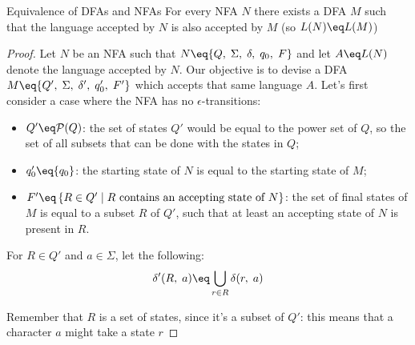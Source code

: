 \begin{theorem}{Equivalence of DFAs and NFAs}
    For every NFA $N$ there exists a DFA $M$ such that the language accepted by $N$ is also accepted by $M$ (so $L(N) \eq L(M)$)

    \begin{proof}
        Let $N$ be an NFA such that $N \eq \{Q, \; \Sigma, \; \delta, \; q_0, \; F \}$ and let $A \eq L(N)$ denote the language accepted by $N$. Our objective is to devise a DFA $M \eq \{Q', \; \Sigma, \; \delta', \; q_0', \; F' \}$ which accepts that same language $A$.
        Let's first consider a case where the NFA has no $\epsilon$-transitions:
        \begin{itemize}
            \item $Q' \eq \mathcal{P}(Q)$: the set of states $Q'$ would be equal to the power set of $Q$, so the set of all subsets that can be done with the states in $Q$;
            \item $q_0' \eq \{ q_0 \}$: the starting state of $N$ is equal to the starting state of $M$;
            \item $F' \eq \left\{ R \in Q' \; | \; R \text{ contains an accepting state of } N \right\}$: the set of final states of $M$ is equal to a subset $R$ of $Q'$, such that at least an accepting state of $N$ is present in $R$.
        \end{itemize}

        For $R \in Q'$ and $a \in \Sigma$, let the following: 
        \[ \delta'(R, \; a) \eq \bigcup_{r \in R} \delta(r, \; a) \]
        
        Remember that $R$ is a set of states, since it's a subset of $Q'$: this means that a character $a$ might take a state $r$ 
    \end{proof}
\end{theorem}